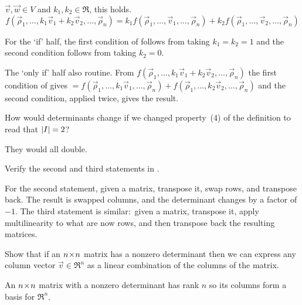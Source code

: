 \begin{exercises}
     \( \vec{v},\vec{w}\in V \) and \( k_1,k_2\in\Re \), this holds.
      \begin{equation*}
         f(\vec{\rho}_1,\dots,k_1\vec{v}_1+k_2\vec{v}_2,
           \dots,\vec{\rho}_n)
         =
         k_1f(\vec{\rho}_1,\dots,\vec{v}_1,\dots,\vec{\rho}_n)+
         k_2f(\vec{\rho}_1,\dots,\vec{v}_2,\dots,\vec{\rho}_n)
       \end{equation*}
       \begin{answer}
         For the `if' half, the first condition of 
          follows from taking $k_1=k_2=1$
         and the second condition follows from taking $k_2=0$.

         The `only if' half also routine.
         From
         $
           f(\vec{\rho}_1,\dots,k_1\vec{v}_1+k_2\vec{v}_2,
             \dots,\vec{\rho}_n)
         $
         the first condition of  gives
         $
           =
           f(\vec{\rho}_1,\dots,k_1\vec{v}_1,\dots,\vec{\rho}_n)+
           f(\vec{\rho}_1,\dots,k_2\vec{v}_2,\dots,\vec{\rho}_n)
         $
         and the second condition, applied twice, gives the 
         result. 
       \end{answer}
  \item 
    How would determinants change if we changed property~(4) of the
    definition to read that \( \deter{I}=2 \)?
    \begin{answer}
       They would all double.
    \end{answer}
  \item 
    Verify the second and third 
    statements in .
    \begin{answer}
      For the second statement, 
      given a matrix, transpose it, swap rows, and transpose back.
      The result is swapped columns, and the determinant changes by a factor
      of \( -1 \).
      The third statement is similar:~given 
      a matrix, transpose it, apply multilinearity to what are now
      rows, and then transpose back the resulting matrices.
    \end{answer}
  \recommended \item
    Show that if an \( n \! \times \! n \) matrix has a nonzero determinant
    then we can express any column vector
    \( \vec{v}\in\Re^n \) as a linear combination
    of the columns of the matrix.
    \begin{answer}
      An \( n \! \times \! n \) matrix with a nonzero determinant has rank
      \( n \) so its columns form a basis for \( \Re^n \).  

\end{answer}
\end{exercises}
